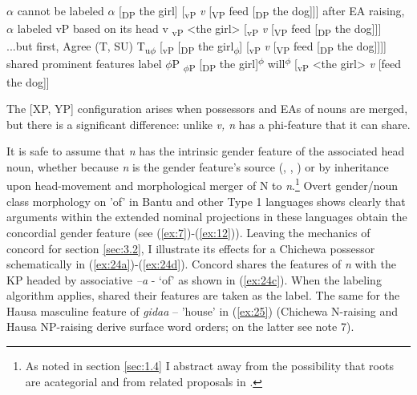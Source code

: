 \documentclass[output=paper
,modfonts
,nonflat]{langsci/langscibook}
\begin{document}
\begin{exe}
\xlist
	\ex $\alpha$ cannot be labeled\newline
	{\lbrack}$\alpha$ [\textsubscript{DP} the girl] [\textsubscript{vP} \textit{v} [\textsubscript{VP} feed [\textsubscript{DP} the dog]]]{\rbrack} 
	\ex after EA raising, $\alpha$ labeled vP based on its head v\newline
	{\lbrack}\textsubscript{vP} {\textless}the girl{\textgreater} [\textsubscript{vP} \textit{v} [\textsubscript{VP} feed [\textsubscript{DP} the dog]]]{\rbrack} 
	\ex ...but first, Agree (T, SU)\newline
	{\lbrack}T\textsubscript{u$\phi$} [\textsubscript{vP} [\textsubscript{DP} the girl\textsubscript{$\phi$}] [\textsubscript{vP} \textit{v} [\textsubscript{VP} feed [\textsubscript{DP} the dog]]]]{\rbrack} 
		\ex shared prominent features label $\phi$P\newline
	{\lbrack}\textsubscript{$\phi$P} [\textsubscript{DP} the girl]\textsuperscript{$\phi$} will\textsuperscript{$\phi$} [\textsubscript{vP} <the girl> \textit{v} [feed the dog]]{\rbrack}  
\endxlist
\end{exe}
The [XP, YP] configuration arises when possessors and EAs of nouns are merged, but there is a significant difference: unlike \textit{v, n} has a phi-feature that it can share. 

It is safe to assume that \textit{n} has the intrinsic gender feature of the associated head noun, whether because \textit{n} is the gender feature's source (\citealt{Kramer2015}, \citealt{Kihm2005}, \citealt{Lecarme2002}) or by inheritance upon head-movement and morphological merger of N to \textit{n}.\footnote{As noted in section \ref{sec:1.4} I abstract away from the possibility that roots are acategorial and from related proposals in \citet{Chomsky2015}.} Overt gender/noun class morphology on 'of' in Bantu and other Type 1 languages shows clearly that arguments within the extended nominal projections in these languages obtain the concordial gender feature (see (\ref{ex:7})-(\ref{ex:12})). Leaving the mechanics of concord for section \ref{sec:3.2}, I illustrate its effects for a Chichewa possessor schematically in (\ref{ex:24a})-(\ref{ex:24d}). Concord shares the features of \textit{n} with the KP headed by associative \textit{–a} - ‘of’ as shown in (\ref{ex:24c}). When the labeling algorithm applies, shared their features are taken as the label. The same for the Hausa masculine feature of \textit{gidaa} – 'house' in (\ref{ex:25}) (Chichewa N-raising and Hausa NP-raising derive surface word orders; on the latter see note 7). 
\end{document}
